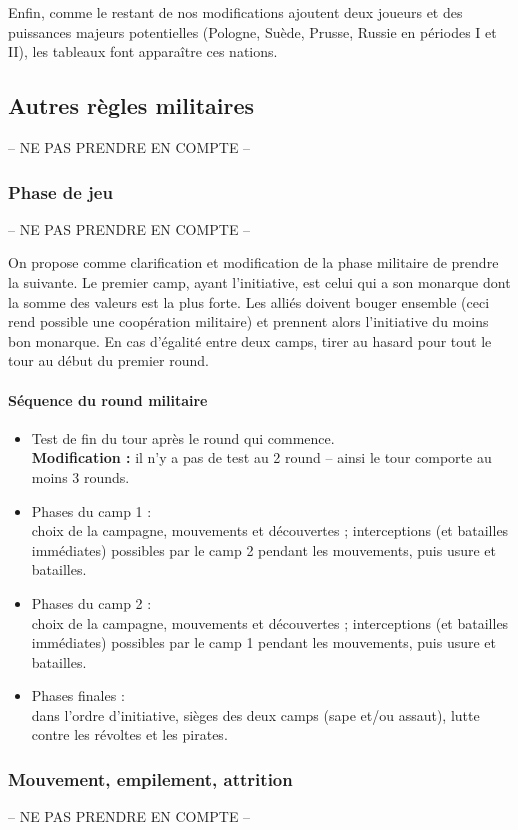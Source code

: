 Enfin, comme le restant de nos modifications ajoutent deux joueurs et des puissances
majeurs potentielles (Pologne, Suède, Prusse, Russie en périodes I et II), 
les tableaux font apparaître ces nations.

\subsection{Autres règles militaires}
-- NE PAS PRENDRE EN COMPTE --

\subsubsection{Phase de jeu}
-- NE PAS PRENDRE EN COMPTE --

On propose comme clarification et modification de la phase militaire de prendre la suivante.
Le premier camp, ayant l'initiative, est celui qui a son monarque
dont la somme des valeurs est la plus forte. Les alliés doivent bouger
ensemble (ceci rend possible une coopération militaire) et prennent alors l'initiative
du moins bon monarque. En cas d'égalité entre deux camps, tirer au hasard pour tout le tour
au début du premier round.
\paragraph{Séquence du round militaire}
\begin{itemize}
\item Test de fin du tour après le round qui commence. \\
\textbf{Modification :} il n'y a pas de test au 2 round -- ainsi le tour
comporte au moins 3 rounds.
\item Phases du camp 1 : \\
choix de la campagne, mouvements et découvertes ; interceptions 
(et batailles immédiates) 
possibles par le camp 2 
pendant les mouvements, puis 
usure et batailles.
\item Phases du camp 2 : \\
choix de la campagne, mouvements et découvertes ; interceptions
(et batailles immédiates) possibles par le camp 1
pendant les mouvements, puis
usure et batailles.
\item Phases finales : \\
dans l'ordre d'initiative, sièges des deux camps (sape et/ou assaut), 
lutte contre les révoltes et les pirates.
\end{itemize}

\subsubsection{Mouvement, empilement, attrition}
-- NE PAS PRENDRE EN COMPTE --

